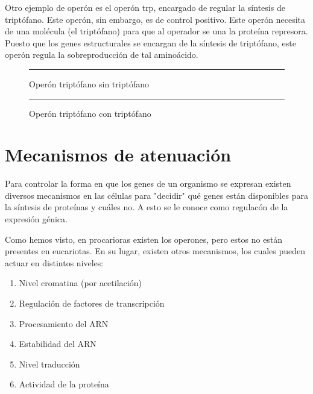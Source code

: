 
Otro ejemplo de operón es el operón trp, encargado de regular la síntesis de triptófano. Este operón, sin embargo, es de control positivo. Este operón necesita de una molécula (el triptófano) para que al operador se una la proteína represora. Puesto que los genes estructurales se encargan de la síntesis de triptófano, este operón regula la sobreproducción de tal aminoácido.

\begin{figure}[H]
    \centering
    \resizebox{\linewidth}{!}{}
    \rule{\linewidth}{0.2pt}
    \caption{Operón triptófano sin triptófano}
    \label{fig:operon_TRP_sin_triptofano}
\end{figure}


\begin{figure}[H]
    \centering
    \resizebox{\linewidth}{!}{}
    \rule{\linewidth}{0.2pt}
    \caption{Operón triptófano con triptófano}
    \label{fig:operon_TRP_con_triptofano}
\end{figure}



\section{Mecanismos de atenuación} %

Para controlar la forma en que los genes de un organismo se expresan existen diversos mecanismos en las células para "decidir" qué genes están disponibles para la síntesis de proteínas y cuáles no. A esto se le conoce como regulacón de la expresión génica.

Como hemos visto, en procarioras existen los operones, pero estos no están presentes en eucariotas. En su lugar, existen otros mecanismos, los cuales pueden actuar en distintos niveles:

\begin{enumerate}
    \item Nivel cromatina (por acetilación)
    \item Regulación de factores de transcripción
    \item Procesamiento del ARN
    \item Estabilidad del ARN
    \item Nivel traducción
    \item Actividad de la proteína
\end{enumerate}

